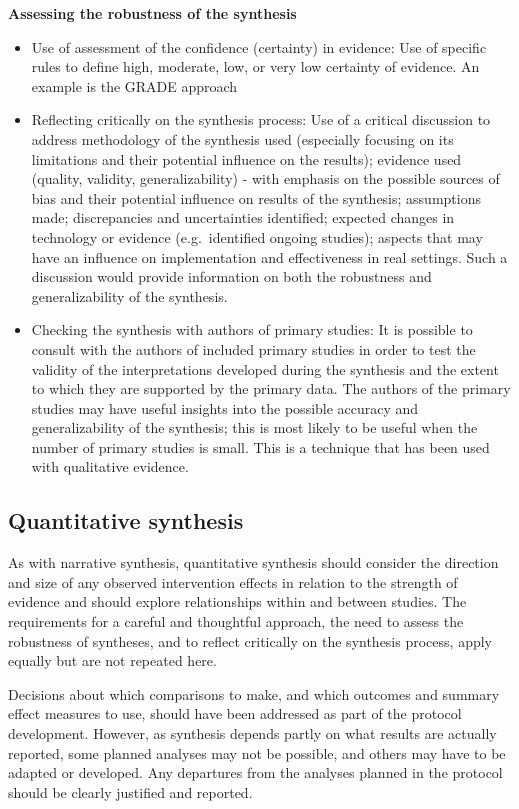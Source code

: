 \documentclass[
  10pt,
  a4paper,
  DIV=11,
  numbers=noendperiod]{scrreprt}
\begin{document}
\textbf{Assessing the robustness of the synthesis}

\begin{itemize}
\item
  Use of assessment of the confidence (certainty) in evidence: Use of
  specific rules to define high, moderate, low, or very low certainty of
  evidence. An example is the GRADE approach
\item
  Reflecting critically on the synthesis process: Use of a critical
  discussion to address methodology of the synthesis used (especially
  focusing on its limitations and their potential influence on the
  results); evidence used (quality, validity, generalizability) - with
  emphasis on the possible sources of bias and their potential influence
  on results of the synthesis; assumptions made; discrepancies and
  uncertainties identified; expected changes in technology or evidence
  (e.g.~identified ongoing studies); aspects that may have an influence
  on implementation and effectiveness in real settings. Such a
  discussion would provide information on both the robustness and
  generalizability of the synthesis.
\item
  Checking the synthesis with authors of primary studies: It is possible
  to consult with the authors of included primary studies in order to
  test the validity of the interpretations developed during the
  synthesis and the extent to which they are supported by the primary
  data. The authors of the primary studies may have useful insights into
  the possible accuracy and generalizability of the synthesis; this is
  most likely to be useful when the number of primary studies is small.
  This is a technique that has been used with qualitative evidence.
\end{itemize}

\subsection{Quantitative synthesis}\label{quantitative-synthesis}

As with narrative synthesis, quantitative synthesis should consider the
direction and size of any observed intervention effects in relation to
the strength of evidence and should explore relationships within and
between studies. The requirements for a careful and thoughtful approach,
the need to assess the robustness of syntheses, and to reflect
critically on the synthesis process, apply equally but are not repeated
here.

Decisions about which comparisons to make, and which outcomes and
summary effect measures to use, should have been addressed as part of
the protocol development. However, as synthesis depends partly on what
results are actually reported, some planned analyses may not be
possible, and others may have to be adapted or developed. Any departures
from the analyses planned in the protocol should be clearly justified
and reported.
\end{document}
